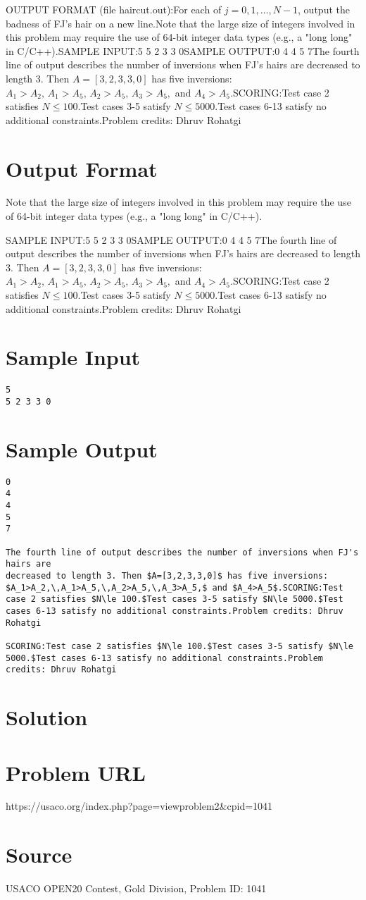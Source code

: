 \documentclass[12pt]{article}
\begin{document}
OUTPUT FORMAT (file haircut.out):For each of $j=0,1,\ldots,N-1$, output the badness of FJ's hair on a new line.Note that the large size of integers involved in this problem may require the
use of 64-bit integer data types (e.g., a "long long" in C/C++).SAMPLE INPUT:5
5 2 3 3 0SAMPLE OUTPUT:0
4
4
5
7The fourth line of output describes the number of inversions when FJ's hairs are
decreased to length 3. Then $A=[3,2,3,3,0]$ has five inversions: 
$A_1>A_2,\,A_1>A_5,\,A_2>A_5,\,A_3>A_5,$ and $A_4>A_5$.SCORING:Test case 2 satisfies $N\le 100.$Test cases 3-5 satisfy $N\le 5000.$Test cases 6-13 satisfy no additional constraints.Problem credits: Dhruv Rohatgi

\section*{Output Format}
Note that the large size of integers involved in this problem may require the
use of 64-bit integer data types (e.g., a "long long" in C/C++).

SAMPLE INPUT:5
5 2 3 3 0SAMPLE OUTPUT:0
4
4
5
7The fourth line of output describes the number of inversions when FJ's hairs are
decreased to length 3. Then $A=[3,2,3,3,0]$ has five inversions: 
$A_1>A_2,\,A_1>A_5,\,A_2>A_5,\,A_3>A_5,$ and $A_4>A_5$.SCORING:Test case 2 satisfies $N\le 100.$Test cases 3-5 satisfy $N\le 5000.$Test cases 6-13 satisfy no additional constraints.Problem credits: Dhruv Rohatgi

\section*{Sample Input}
\begin{verbatim}
5
5 2 3 3 0
\end{verbatim}

\section*{Sample Output}
\begin{verbatim}
0
4
4
5
7

The fourth line of output describes the number of inversions when FJ's hairs are
decreased to length 3. Then $A=[3,2,3,3,0]$ has five inversions: 
$A_1>A_2,\,A_1>A_5,\,A_2>A_5,\,A_3>A_5,$ and $A_4>A_5$.SCORING:Test case 2 satisfies $N\le 100.$Test cases 3-5 satisfy $N\le 5000.$Test cases 6-13 satisfy no additional constraints.Problem credits: Dhruv Rohatgi

SCORING:Test case 2 satisfies $N\le 100.$Test cases 3-5 satisfy $N\le 5000.$Test cases 6-13 satisfy no additional constraints.Problem credits: Dhruv Rohatgi
\end{verbatim}

\section*{Solution}


\section*{Problem URL}
https://usaco.org/index.php?page=viewproblem2&cpid=1041

\section*{Source}
USACO OPEN20 Contest, Gold Division, Problem ID: 1041
\end{document}
